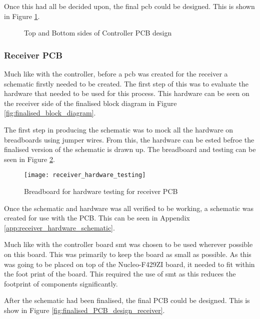 \documentclass [11pt]{article}
\begin{document}
Once this had all be decided upon, the final \gls{pcb} could be designed. This is shown in Figure \ref{fig:finalised_PCB_design_controller}.

\begin{figure}[H]
\centering
{}
\caption{Top and Bottom sides of Controller PCB design}
\label{fig:finalised_PCB_design_controller}
\end{figure} 

\subsubsection{Receiver PCB}

Much like with the controller, before a \gls{pcb} was created for the receiver a schematic firstly needed to be created. The first step of this was to evaluate the hardware that needed to be used for this process. This hardware can be seen on the receiver side of the finalised block diagram in Figure \ref{fig:finalised_block_diagram}.

The first step in producing the schematic was to mock all the hardware on breadboards using jumper wires. From this, the hardware can be ested befroe the finalised version of the schematic is drawn up. The breadboard and testing can be seen in Figure \ref{fig:receiver_hardware_testing}.

\begin{figure}[H]
\centerline{\texttt{[image: receiver\_hardware\_testing]}}
\caption{Breadboard for hardware testing for receiver PCB}
\label{fig:receiver_hardware_testing}
\end{figure}

Once the schematic and hardware was all verified to be working, a schematic was created for use with the PCB. This can be seen in Appendix \ref{app:receiver_hardware_schematic}.

Much like with the controller board \gls{smt} was chosen to be used wherever possible on this board. This was primarily to keep the board as small as possible. As this was going to be placed on top of the Nucleo-F429ZI board, it needed to fit within the foot print of the board. This required the use of \gls{smt} as this reduces the footprint of components significantly. 

After the schematic had been finalised, the final PCB could be designed. This is show in Figure \ref{fig:finalised_PCB_design_receiver}.
\end{document}
